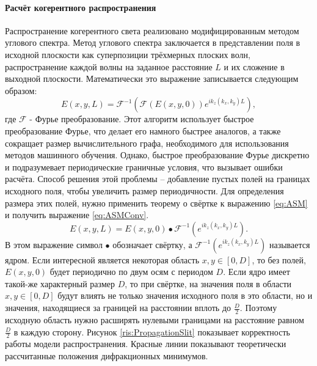 \paragraph{Расчёт когерентного распространения}
Распространение когерентного света реализовано модифицированным методом углового спектра. Метод углового спектра заключается в представлении поля в исходной плоскости как суперпозиции трёхмерных плоских волн, распространение каждой волны на заданное расстояние $L$ и их сложение в выходной плоскости. Математически это выражение записывается следующим образом:
\begin{equation}\label{eq:ASM}
	E(x,y,L) = \mathcal{F}^{-1}\left(\mathcal{F}\left(E(x,y,0)\right)e^{ik_z(k_x,k_y)L}\right),
\end{equation}
где $\mathcal{F}$ - Фурье преобразование. Этот алгоритм использует быстрое преобразование Фурье, что делает его намного быстрее аналогов, а также сокращает размер вычислительного графа, необходимого для использования методов машинного обучения. Однако, быстрое преобразование Фурье дискретно и подразумевает периодические граничные условия, что вызывает ошибки расчёта. Способ решения этой проблемы -- добавление пустых полей на границах исходного поля, чтобы увеличить размер периодичности. Для определения размера этих полей, нужно применить теорему о свёртке к выражению \ref{eq:ASM} и получить выражение \ref{eq:ASMConv}.
\begin{equation}\label{eq:ASMConv}
	E(x,y,L) = E(x,y,0) \bullet \mathcal{F}^{-1}\left(e^{ik_z(k_x,k_y)L}\right).
\end{equation}
В этом выражение символ $\bullet$ обозначает свёртку, а $\mathcal{F}^{-1}\left(e^{ik_z(k_x,k_y)L}\right)$ называется ядром. Если интересной является некоторая область $x,y \in [0,D]$, то без полей, $E(x,y,0)$ будет периодично по двум осям с периодом $D$. Если ядро имеет такой-же характерный размер $D$, то при свёртке, на значения поля в области $x,y \in [0,D]$ будут влиять не только значения исходного поля в это области, но и значения, находящиеся за границей на расстоянии вплоть до $\frac{D}{2}$. Поэтому исходную область нужно расширять нулевыми границами на расстояние равном $\frac{D}{2}$ в каждую сторону. Рисунок \ref{ris:PropagationSlit} показывает корректность работы модели распространения. Красные линии показывают теоретически рассчитанные положения дифракционных минимумов.
